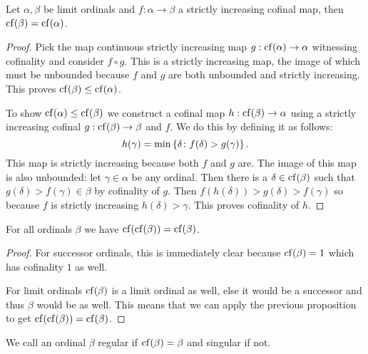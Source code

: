 \begin{proposition}
    Let \(\alpha,\beta\) be limit ordinals and \(f:\alpha\to\beta\) a strictly
    increasing cofinal map, then \(\operatorname{cf}(\beta)=\operatorname{cf}(\alpha)\).

    \begin{proof}
        Pick the map continuous strictly increasing map
        \(g:\operatorname{cf}(\alpha)\to\alpha\) witnessing cofinality and consider \(f\circ
        g\). This is a strictly increasing map, the image of which must be
        unbounded because \(f\) and \(g\) are both unbounded and strictly
        increasing. This proves \(\operatorname{cf}(\beta)\leq\operatorname{cf}(\alpha)\).

        To show \(\operatorname{cf}(\alpha)\leq\operatorname{cf}(\beta)\) we construct a cofinal map
        \(h:\operatorname{cf}(\beta)\to\alpha\) using a strictly increasing cofinal
        \(g:\operatorname{cf}(\beta)\to\beta\) and \(f\). We do this by defining it as
        follows:
        \[
            h(\gamma)=\min\left\{\delta\colon f(\delta)>g(\gamma)\right\}.
        \]
        This map is strictly increasing because both \(f\) and \(g\) are. The
        image of this map is also unbounded: let \(\gamma\in\alpha\) be any
        ordinal. Then there is a \(\delta\in\operatorname{cf}(\beta)\) such that
        \(g(\delta)>f(\gamma)\in\beta\) by cofinality of \(g\). Then
        \(f(h(\delta))>g(\delta)>f(\gamma)\) so because \(f\) is strictly
        increasing \(h(\delta)>\gamma\). This proves cofinality of \(h\).
    \end{proof}
\end{proposition}

\begin{corollary}
    For all ordinals \(\beta\) we have \(\operatorname{cf}(\operatorname{cf}(\beta))=\operatorname{cf}(\beta)\).

    \begin{proof}
        For successor ordinals, this is immediately clear because
        \(\operatorname{cf}(\beta)=1\) which has cofinality \(1\) as well.

        For limit ordinals \(\operatorname{cf}(\beta)\) is a limit ordinal as well, else it
        would be a successor and thus \(\beta\) would be as well. This means
        that we can apply the previous proposition to get
        \(\operatorname{cf}(\operatorname{cf}(\beta))=\operatorname{cf}(\beta)\).
    \end{proof}
\end{corollary}

\begin{definition}
    We call an ordinal \(\beta\) regular if \(\operatorname{cf}(\beta)=\beta\) and
    singular if not.
\end{definition}

